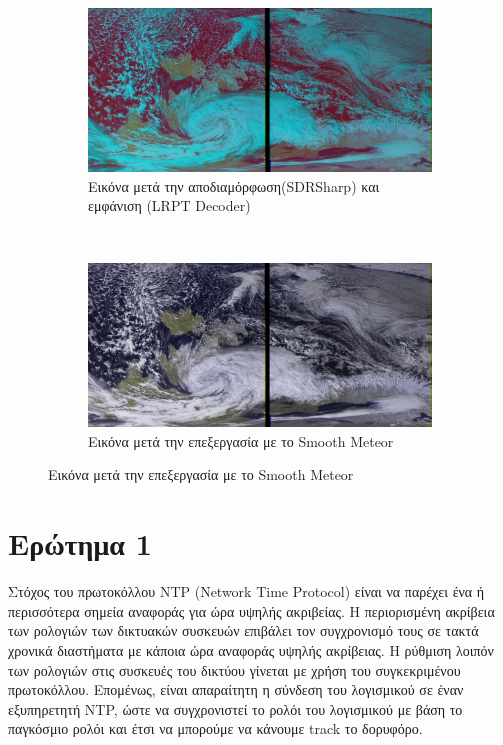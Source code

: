 \documentclass{article}
\begin{document}
\begin{figure}[h!]
	\centering
	\begin{subfigure}[t]{\textwidth}
		\centering
		\includegraphics[width=\linewidth]{./results/meteor_img.jpg}
		\caption{Eικόνα μετά την αποδιαμόρφωση(SDRSharp) και εμφάνιση (LRPT Decoder)}
	\end{subfigure}
	~
	\begin{subfigure}[t]{\textwidth}
		\centering
		\includegraphics[width=\linewidth]{./results/meteor_smooth_img.jpg}
		\caption{Eικόνα μετά την επεξεργασία με το  Smooth Meteor}
	\end{subfigure}
\end{figure}
\pagebreak
\section{Eρώτημα 1}
Στόχος του πρωτοκόλλου NTP (Network Time Protocol) είναι να παρέχει ένα ή περισσότερα σημεία αναφοράς για ώρα υψηλής ακριβείας. Η περιορισμένη ακρίβεια των ρολογιών των δικτυακών συσκευών επιβάλει τον συγχρονισμό τους σε τακτά χρονικά διαστήματα με κάποια ώρα αναφοράς υψηλής ακρίβειας. Η ρύθμιση λοιπόν των ρολογιών στις συσκευές του δικτύου γίνεται με χρήση του συγκεκριμένου πρωτοκόλλου. Επομένως, είναι απαραίτητη η σύνδεση του λογισμικού σε έναν εξυπηρετητή NTP, ώστε να συγχρονιστεί το ρολόι του λογισμικού με βάση το παγκόσμιο ρολόι και έτσι να μπορούμε να κάνουμε track το δορυφόρο.
\end{document}
